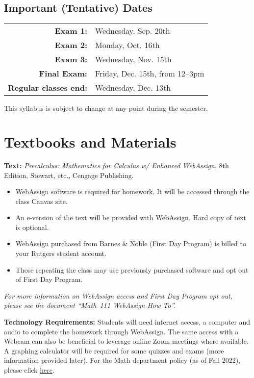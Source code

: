 \documentclass{article}
\begin{document}
\subsection*{Important (Tentative) Dates}

\begin{center}
    \begin{tabular}{rl}
        \textbf{Exam 1:} & Wednesday, Sep. 20th \\
        \textbf{Exam 2:} & Monday, Oct. 16th \\
        \textbf{Exam 3:} & Wednesday, Nov. 15th \\
        \textbf{Final Exam:} & Friday, Dec. 15th, from 12--3pm \\
        \textbf{Regular classes end:} & Wednesday, Dec. 13th
    \end{tabular}
\end{center}

\noindent This syllabus is subject to change at any point during the semester.

\section*{Textbooks and Materials}
\noindent \textbf{Text:} \textit{Precalculus: Mathematics for Calculus w/ Enhanced WebAssign}, 8th Edition, Stewart, etc., Cengage Publishing. \par
\begin{itemize}
    \item WebAssign software is required for homework. It will be accessed through the class Canvas site.
    \item An e-version of the text will be provided with WebAssign. Hard copy of text is optional.
    \item WebAssign purchased from Barnes \& Noble (First Day Program) is billed to your Rutgers student account.
    \item Those repeating the class may use previously purchased software and opt out of First Day Program.
\end{itemize}
\textit{For more information on WebAssign access and First Day Program opt out, please see the document ``Math~111 WebAssign How To''.} \par
\hfill \par
\noindent \textbf{Technology Requirements:} Students will need internet access, a computer and audio to complete the homework through WebAssign. The same access with a Webcam can also be beneficial to leverage online Zoom meetings where available. A graphing calculator will be required for some quizzes and exams (more information provided later). For the Math department policy (as of Fall 2022), please click \href{https://math.rutgers.edu/academics/undergraduate/1693-technology-requirements-for-math-courses-in-fall-2022}{here}. \par
\hfill \par
\end{document}
